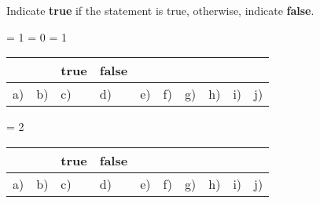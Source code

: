 
    

    
    
\question[10] Indicate \textbf{true} if the statement is true, otherwise, indicate \textbf{false}.

\ifnum \SetNumber = 1
    \vspace{-0.8cm}
    \ifnum \Solutions = 0
        \setlength{\extrarowheight}{0.20cm}
    \fi
    \ifnum \Solutions = 1 
        \setlength{\extrarowheight}{0.00cm}
    \fi    
    \begin{center}
    \hspace{-.9cm}\begin{tabular}{ p{.15cm} p{14.2cm} p{.6cm} p{.6cm} }
        & & true &  false  \\[2pt] \hline 
        a) & 
        b) & 
        c) & 
        d) & 
        e) & 
        f) & 
        g) & 
        h) & 
        i) & 
        j) & 
    \end{tabular}
    \end{center}
    \setlength{\extrarowheight}{0.0cm}
\fi

\ifnum \SetNumber = 2
    \vspace{-0.8cm}
    \setlength{\extrarowheight}{0.20cm}
    \begin{center}
    \hspace{-.9cm}\begin{tabular}{ p{.15cm} p{14.2cm} p{.6cm} p{.6cm} }
        & & true &  false  \\[2pt] \hline 
        a) & 
        b) & 
        c) & 
        d) & 
        e) & 
        f) & 
        g) & 
        h) & 
        i) & 
        j) &           
    \end{tabular}
    \end{center}
    \setlength{\extrarowheight}{0.0cm}
\fi